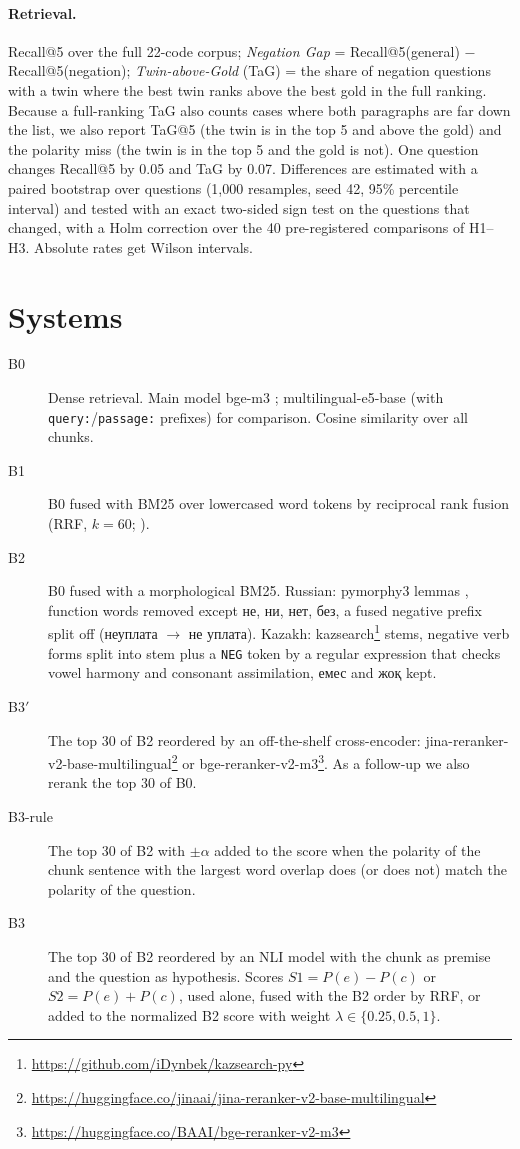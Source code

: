 \documentclass[11pt]{article}
\newcommand{\ru}[1]{#1}
\begin{document}
\paragraph{Retrieval.} Recall@5 over the full 22-code corpus; \emph{Negation Gap} = Recall@5(general) $-$
Recall@5(negation); \emph{Twin-above-Gold} (TaG) = the share of negation questions with a twin where the best
twin ranks above the best gold in the full ranking. Because a full-ranking TaG also counts cases where both
paragraphs are far down the list, we also report TaG@5 (the twin is in the top 5 and above the gold) and the
polarity miss (the twin is in the top 5 and the gold is not). One question changes Recall@5 by 0.05 and TaG by
0.07. Differences are estimated with a paired bootstrap over questions (1,000 resamples, seed 42, 95\%
percentile interval) and tested with an exact two-sided sign test on the questions that changed, with a Holm
correction over the 40 pre-registered comparisons of H1--H3. Absolute rates get Wilson intervals.

\section{Systems}

\begin{description}
\item[B0] Dense retrieval. Main model bge-m3 \citep{chen2024m3}; multilingual-e5-base \citep{wang2024multilingual}
(with \texttt{query:}/\texttt{passage:} prefixes) for comparison. Cosine similarity over all chunks.
\item[B1] B0 fused with BM25 \citep{robertson2009prf} over lowercased word tokens by reciprocal rank fusion
(RRF, $k=60$; \citealp{cormack2009rrf}).
\item[B2] B0 fused with a morphological BM25. Russian: pymorphy3 lemmas \citep{korobov2015pymorphy2}, function words removed except
\ru{не, ни, нет, без}, a fused negative prefix split off (\ru{неуплата} $\rightarrow$ \ru{не уплата}).
Kazakh: kazsearch\footnote{\url{https://github.com/iDynbek/kazsearch-py}} stems, negative verb forms split into stem plus a \texttt{NEG} token by a regular
expression that checks vowel harmony and consonant assimilation, \ru{емес} and \ru{жоқ} kept.
\item[B3$'$] The top 30 of B2 reordered by an off-the-shelf cross-encoder: jina-reranker-v2-base-multilingual\footnote{\url{https://huggingface.co/jinaai/jina-reranker-v2-base-multilingual}}
or bge-reranker-v2-m3\footnote{\url{https://huggingface.co/BAAI/bge-reranker-v2-m3}}. As a follow-up we also rerank the top 30 of B0.
\item[B3-rule] The top 30 of B2 with $\pm\alpha$ added to the score when the polarity of the chunk sentence
with the largest word overlap does (or does not) match the polarity of the question.
\item[B3] The top 30 of B2 reordered by an NLI model with the chunk as premise and the question as hypothesis.
Scores $S1 = P(e) - P(c)$ or $S2 = P(e) + P(c)$, used alone, fused with the B2 order by RRF, or added to the
normalized B2 score with weight $\lambda \in \{0.25, 0.5, 1\}$.
\end{description}
\end{document}
